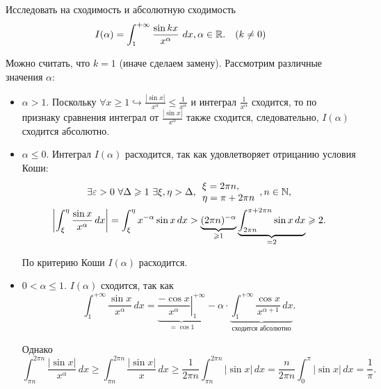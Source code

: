 
\begin{example}
    Исследовать на сходимость и абсолютную сходимость
    \[
        I(\alpha) = \int_1^{+\infty} \frac{\sin kx}{x^\alpha}\,\, dx, \alpha \in \mathbb{R}. \quad (k \neq 0)
    \]

    \begin{solution}
        Можно считать, что \emph{$k = 1$} (иначе сделаем замену). Рассмотрим различные значения $\alpha$:
        \begin{itemize}
            \item \emph{$\alpha > 1$}. Поскольку $\forall x \ge 1 \hookrightarrow \frac{|\sin x|}{x^{\alpha}} \le \frac{1}{x^\alpha}$ и интеграл $\frac{1}{x^\alpha}$ сходится, то по признаку сравнения интеграл от $\frac{|\sin x|}{x^\alpha}$ также сходится, следовательно, $I(\alpha)$ сходится абсолютно.

            \item \emph{$\alpha \le 0$}. Интеграл $I(\alpha)$ расходится, так как удовлетворяет отрицанию условия Коши:
                \begin{gather*}
                    \exists \epsilon > 0 \ \forall \Delta \ge 1 \ \exists \xi, \eta > \Delta,
                    \begin{array}{l}
                        \xi = 2\pi n, \\
                        \eta = \pi + 2\pi n
                    \end{array}, n \in \N, \\
                    \left|\int_\xi^\eta \frac{\sin x}{x^\alpha}\, dx\right| = \int_\xi^\eta x^{-\alpha} \sin x\, dx > \underbrace{(2\pi n)^{-\alpha}}_{\ge 1} \underbrace{\int_{2\pi n}^{\pi + 2\pi n} \sin x\, dx}_{=2} \ge 2.
                \end{gather*}

                По критерию Коши $I(\alpha)$ расходится.

            \item \emph{$0 < \alpha \le 1$}. $I(\alpha)$ сходится, так как
                \[
                    \int_1^{+\infty} \frac{\sin x}{x^\alpha}\, dx = \underbrace{\left.\frac{-\cos x}{x^\alpha}\right|_{1}^{+\infty}}_{=\cos 1} - \alpha \cdot \underbrace{\int_1^{+\infty} \frac{\cos x}{x^{\alpha + 1}}\, dx}_{\text{сходится абсолютно}}.
                \]

                Однако
                \[
                    \int_{\pi n}^{2\pi n} \frac{|\sin x|}{x^\alpha}\, dx \ge \int_{\pi n}^{2\pi n} \frac{|\sin x|}{x}\, dx \ge \frac{1}{2\pi n} \int_{\pi n}^{2\pi n} |\sin x|\, dx = \frac{n}{2\pi n} \int_0^\pi |\sin x|\, dx = \frac{1}{\pi}.
                \]


\end{itemize}
\end{solution}
\end{example}
